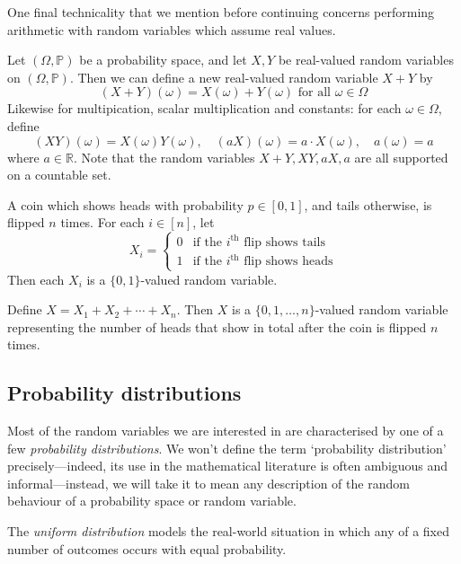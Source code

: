 One final technicality that we mention before continuing concerns performing arithmetic with random variables which assume real values.

\begin{notation}
\label{ntnRandomVariableArithmetic}
Let $(\Omega,\mathbb{P})$ be a probability space, and let $X,Y$ be real-valued random variables on $(\Omega,\mathbb{P})$. Then we can define a new real-valued random variable $X+Y$ by
\[ (X+Y)(\omega) = X(\omega) + Y(\omega) \text{ for all } \omega \in \Omega \]
Likewise for multipication, scalar multiplication and constants: for each $\omega \in \Omega$, define
\[ (XY)(\omega) = X(\omega)Y(\omega), \quad (aX)(\omega) = a \cdot X(\omega), \quad a(\omega)=a \]
where $a \in \mathbb{R}$. Note that the random variables $X+Y, XY, aX, a$ are all supported on a countable set.
\end{notation}

\begin{example}
A coin which shows heads with probability $p \in [0,1]$, and tails otherwise, is flipped $n$ times. For each $i \in [n]$, let
\[ X_i = \begin{cases} 0 & \text{if the } i^{\text{th}} \text{ flip shows tails} \\
1 & \text{if the } i^{\text{th}} \text{ flip shows heads} \end{cases} \]
Then each $X_i$ is a $\{ 0,1 \}$-valued random variable.

Define $X = X_1 + X_2 + \cdots + X_n$. Then $X$ is a $\{ 0,1,\dots,n \}$-valued random variable representing the number of heads that show in total after the coin is flipped $n$ times.
\end{example}

\subsection*{Probability distributions}

Most of the random variables we are interested in are characterised by one of a few \textit{probability distributions}. We won't define the term `probability distribution' precisely---indeed, its use in the mathematical literature is often ambiguous and informal---instead, we will take it to mean any description of the random behaviour of a probability space or random variable.

The \textit{uniform distribution} models the real-world situation in which any of a fixed number of outcomes occurs with equal probability.

